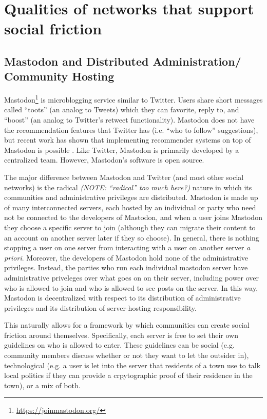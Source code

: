 \documentclass[sigconf,authordraft]{acmart}
\begin{document}
\section{Qualities of networks that support social friction}

\subsection{Mastodon and Distributed Administration/ Community Hosting}

Mastodon\footnote{\url{https://joinmastodon.org/}} is microblogging service similar to Twitter. Users share short messages called ``toots'' (an analog to Tweets) which they can favorite, reply to, and ``boost'' (an analog to Twitter's retweet functionality). Mastodon does not have the recommendation features that Twitter has (i.e. ``who to follow'' suggestions), but recent work has shown that implementing recommender systems on top of Mastodon is possible \cite{trienes2018recommending}. Like Twitter, Mastodon is primarily developed by a centralized team. However, Mastodon's software is open source.

The major difference between Mastodon and Twitter (and most other social networks) is the radical {\itshape (NOTE: ``radical'' too much here?)} nature in which its communities and administrative privileges are distributed. Mastodon is made up of many interconnected servers, each hosted by an individual or party who need not be connected to the developers of Mastodon, and when a user joins Mastodon they choose a specific server to join (although they can migrate their content to an account on another server later if they so choose). In general, there is nothing stopping a user on one server from interacting with a user on another server {\itshape a priori}. Moreover, the developers of Mastodon hold none of the administrative privileges. Instead, the parties who run each individual mastodon server have administrative priveleges over what goes on on their server, including power over who is allowed to join and who is allowed to see posts on the server. In this way, Mastodon is decentralized with respect to its distribution of administrative privileges and its distribution of server-hosting responsibility.

This naturally allows for a framework by which communities can create social friction around themselves. Specifically, each server is free to set their own guidelines on who is allowed to enter. These guidelines can be social (e.g. community members discuss whether or not they want to let the outsider in), technological (e.g. a user is let into the server that residents of a town use to talk local politics if they can provide a crpytographic proof of their residence in the town), or a mix of both. 
\end{document}
